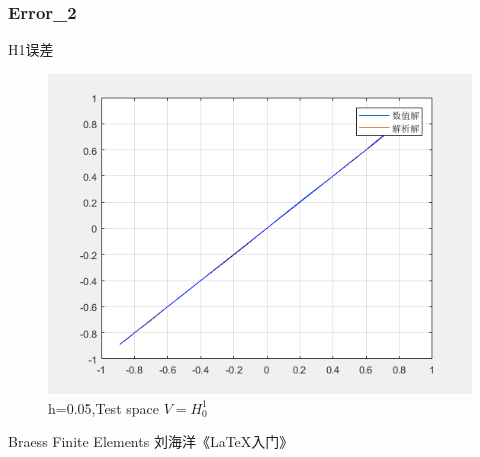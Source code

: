 \documentclass{beamer}
\begin{document}
\begin{frame}
\frametitle{Error\_2}
H1误差
\begin{figure}[h!t!b]
	\centering	
	\includegraphics[height=0.4\linewidth]{./pictures/040.png}
	\caption{h=0.05,Test space $V=H^1_0$}\label{fig:1}
\end{figure}
\end{frame}



\begin{thebibliography}{99}
 Braess  Finite Elements
 刘海洋《\LaTeX 入门》
\end{thebibliography}
\end{document}
